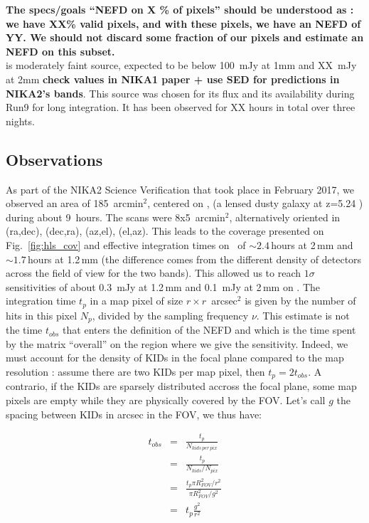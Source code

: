 {\bf The specs/goals ``NEFD on X \% of pixels'' should be understood as : we have
XX\% valid pixels, and with these pixels, we have an NEFD of YY. We should not
discard some fraction of our pixels and estimate an NEFD on this subset.}\\

\hls is moderately faint source, expected to be below 100~mJy at 1mm and
XX~mJy at 2mm {\bf check values in NIKA1 paper + use SED for predictions in
  NIKA2's bands}. This source was chosen for its flux and its availability during
Run9 for long integration. It has been observed for XX hours in total over three
nights.


\subsection{Observations}

As part of the NIKA2 Science Verification that took place in February 2017, we
observed an area of 185~arcmin$^2$, centered on \hls, (a lensed dusty galaxy at
z=5.24 \cite{combes2012}) during about 9~hours. The scans were 8x5~arcmin$^2$,
alternatively oriented in (ra,dec), (dec,ra), (az,el), (el,az). This leads to
the coverage presented on Fig.~\ref{fig:hls_cov} and effective integration times
on \hls\ of $\sim 2.4$\,hours at 2\,mm and $\sim 1.7$\,hours at 1.2\,mm (the
difference comes from the different density of detectors across the field of
view for the two bands). This allowed us to reach $1\sigma$ sensitivities of
about 0.3~mJy at 1.2\,mm and 0.1~mJy at 2\,mm on \hls. The integration time
$t_p$ in a
map pixel of size $r\times r$~arcsec$^2$ is given by the number of hits in
this pixel $N_p$, divided by the sampling frequency $\nu$. This estimate is not
the time $t_{obs}$ that enters the definition of the NEFD and which is the time
spent by the matrix ``overall'' on the region where we give the
sensitivity. Indeed, we must account for the density of KIDs in the focal plane
compared to the map resolution : assume there are two KIDs per map pixel, then
$t_p = 2 t_{obs}$. A contrario, if the KIDs are sparsely distributed accross the
focal plane, some map pixels are empty while they are physically covered by the
FOV. Let's call $g$ the spacing between KIDs in arcsec in the FOV, we thus have:

\begin{eqnarray}
t_{obs} &=& \frac{t_p}{N_{kids\,per\,pix}} \nonumber\\
&=& \frac{t_p}{N_{kids}/N_{pix}} \nonumber\\
&=& \frac{t_p\pi R_{FOV}^2/r^2}{\pi R_{FOV}^2/g^2} \nonumber\\
&=&t_p \frac{g^2}{r^2}
\end{eqnarray}

